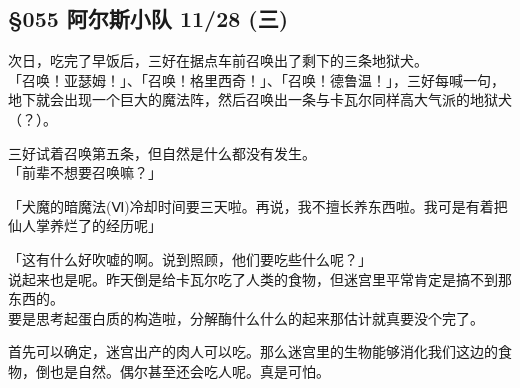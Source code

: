 \subsection{§055 阿尔斯小队 11/28 (三)}

次日，吃完了早饭后，三好在据点车前召唤出了剩下的三条地狱犬。\\

「召唤！亚瑟姆！」、「召唤！格里西奇！」、「召唤！德鲁温！」，三好每喊一句，地下就会出现一个巨大的魔法阵，然后召唤出一条与卡瓦尔同样高大气派的地狱犬（？）。

三好试着召唤第五条，但自然是什么都没有发生。\\

「前辈不想要召唤嘛？」

「犬魔的暗魔法(Ⅵ)冷却时间要三天啦。再说，我不擅长养东西啦。我可是有着把仙人掌养烂了的经历呢」

「这有什么好吹嘘的啊。说到照顾，他们要吃些什么呢？」\\

说起来也是呢。昨天倒是给卡瓦尔吃了人类的食物，但迷宫里平常肯定是搞不到那东西的。\\

要是思考起蛋白质的构造啦，分解酶什么什么的起来那估计就真要没个完了。

首先可以确定，迷宫出产的肉人可以吃。那么迷宫里的生物能够消化我们这边的食物，倒也是自然。偶尔甚至还会吃人呢。真是可怕。\\

